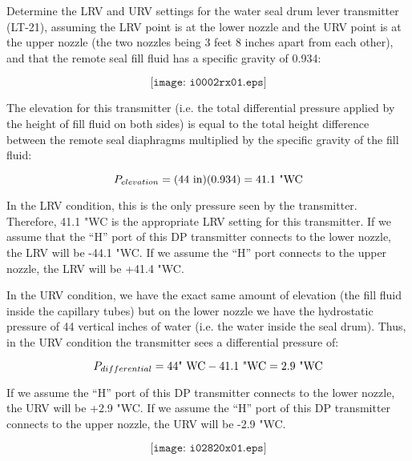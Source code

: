 

Determine the LRV and URV settings for the water seal drum lever transmitter (LT-21), assuming the LRV point is at the lower nozzle and the URV point is at the upper nozzle (the two nozzles being 3 feet 8 inches apart from each other), and that the remote seal fill fluid has a specific gravity of 0.934:

$$\texttt{[image: i0002rx01.eps]}$$







The elevation for this transmitter (i.e. the total differential pressure applied by the height of fill fluid on both sides) is equal to the total height difference between the remote seal diaphragms multiplied by the specific gravity of the fill fluid:

$$P_{elevation} = (44 \hbox{ in})(0.934) = 41.1 \hbox{ "WC}$$

In the LRV condition, this is the only pressure seen by the transmitter.  Therefore, 41.1 "WC is the appropriate LRV setting for this transmitter.  If we assume that the ``H'' port of this DP transmitter connects to the lower nozzle, the LRV will be -44.1 "WC.  If we assume the ``H'' port connects to the upper nozzle, the LRV will be +41.4 "WC.

\vskip 10pt

In the URV condition, we have the exact same amount of elevation (the fill fluid inside the capillary tubes) but on the lower nozzle we have the hydrostatic pressure of 44 vertical inches of water (i.e. the water inside the seal drum).  Thus, in the URV condition the transmitter sees a differential pressure of:

$$P_{differential} = 44 \hbox{" WC} - 41.1 \hbox{ "WC} = 2.9 \hbox{ "WC}$$

If we assume the ``H'' port of this DP transmitter connects to the lower nozzle, the URV will be +2.9 "WC.  If we assume the ``H'' port of this DP transmitter connects to the upper nozzle, the URV will be -2.9 "WC.

$$\texttt{[image: i02820x01.eps]}$$






